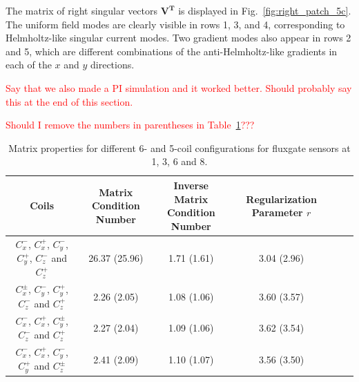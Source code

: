 
The matrix of right singular vectors $\bm{V^T}$ is displayed in
Fig.~\ref{fig:right_patch_5c}.  The uniform field modes are clearly
visible in rows 1, 3, and 4, corresponding to Helmholtz-like singular
current modes.  Two gradient modes also appear in rows 2 and 5, which
are different combinations of the anti-Helmholtz-like gradients in
each of the $x$ and $y$ directions.

\textcolor{red}{Say that we also made a PI simulation and it worked better.  Should probably say this at the end of this section.}

\textcolor{red}{Should I remove the numbers in parentheses in Table~\ref{table:mcond_coil}???}


\begin{table} [htb!]
    \centering
    \begin{tabular} { |c|c|c|c|c|c|} 
        \hline
        Coils & \makecell{Matrix \\Condition Number} &\makecell{Inverse Matrix \\ Condition Number} & \makecell{Regularization \\Parameter $r$}\\
        \hline\hline
        \makecell{$C_x^-$, $C_x^+$, $C_y^-$,\\ $C_y^+$, $C_z^-$ and $C_z^+$ } & 26.37 (25.96) & 1.71 (1.61) & 3.04 (2.96) \\ 
        \hline
        \makecell{$C_x^{\pm}$, $C_y^-$, $C_y^+$,\\ $C_z^-$ and $C_z^+$ } & 2.26 (2.05) & 1.08 (1.06) & 3.60 (3.57) \\         
        \hline
        \makecell{$C_x^-$, $C_x^+$, $C_y^\pm$,\\ $C_z^-$ and $C_z^+$ } & 2.27 (2.04) & 1.09 (1.06) & 3.62 (3.54) \\
        \hline
        \makecell{$C_x^-$, $C_x^+$, $C_y^-$,\\ $C_y^+$ and $C_z^\pm$ } & 2.41 (2.09) & 1.10 (1.07) & 3.56 (3.50) \\
        \hline

    \end{tabular}
    \caption[Properties for different coil configurations]{Matrix properties for different 6- and 5-coil configurations for fluxgate sensors at 1, 3, 6 and 8.}\label{table:mcond_coil}
\end{table}


